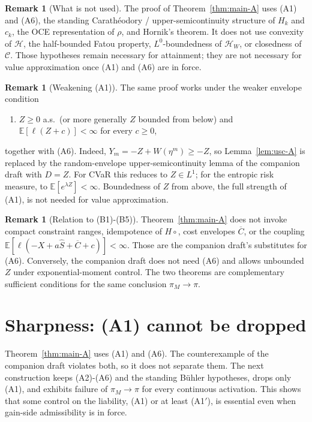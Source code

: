 \documentclass[11pt,a4paper]{report}
\numberwithin{equation}{chapter}
\theoremstyle{plain}
\theoremstyle{definition}
\newtheorem{remark}[proposition]{Remark}
\newcommand{\E}{\mathbb{E}}
\newcommand{\HH}{\mathcal{H}}
\newcommand{\CC}{\mathcal{C}}
\begin{document}
\begin{remark}[What is not used]\label{rem:unused}
    The proof of Theorem~\ref{thm:main-A} uses (A1) and (A6), the standing Carath\'eodory / upper-semicontinuity structure of $H_k$ and $c_k$, the OCE representation of $\rho$, and Hornik's theorem. It does not use convexity of $\HH$, the half-bounded Fatou property, $L^0$-boundedness of $\HH_W$, or closedness of $\CC$. Those hypotheses remain necessary for attainment; they are not necessary for value approximation once (A1) and (A6) are in force.
\end{remark}

\begin{remark}[Weakening (A1)]\label{rem:A1prime}
    The same proof works under the weaker envelope condition
    \begin{enumerate}[leftmargin=*,label=\textup{(A1$'$)}]
        \item $Z\ge0$ a.s.\ (or more generally $Z$ bounded from below) and $\E[\ell(Z+c)]<\infty$ for every $c\ge0$,
    \end{enumerate}
    together with (A6). Indeed, $Y_m=-Z+W(\eta^m)\ge-Z$, so Lemma~\ref{lem:usc-A} is replaced by the random-envelope upper-semicontinuity lemma of the companion draft with $D=Z$. For CVaR this reduces to $Z\in L^1$; for the entropic risk measure, to $\E[e^{\lambda Z}]<\infty$. Boundedness of $Z$ from above, the full strength of (A1), is not needed for value approximation.
\end{remark}

\begin{remark}[Relation to (B1)-(B5)]\label{rem:vs-B}
    Theorem~\ref{thm:main-A} does not invoke compact constraint ranges, idempotence of $H\circ{}$, cost envelopes $\overline C$, or the coupling $\E[\ell(-X+a\widehat S+\overline C+c)]<\infty$. Those are the companion draft's substitutes for (A6). Conversely, the companion draft does not need (A6) and allows unbounded $Z$ under exponential-moment control. The two theorems are complementary sufficient conditions for the same conclusion $\pi_M\to\pi$.
\end{remark}

\section{Sharpness: (A1) cannot be dropped}\label{sec:sharp-A}

Theorem~\ref{thm:main-A} uses (A1) and (A6). The counterexample of the companion draft violates both, so it does not separate them. The next construction keeps (A2)-(A6) and the standing B\"uhler hypotheses, drops only (A1), and exhibits failure of $\pi_M\to\pi$ for every continuous activation. This shows that some control on the liability, (A1) or at least (A1$'$), is essential even when gain-side admissibility is in force.
\end{document}
